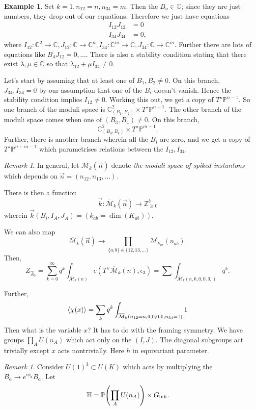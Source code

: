 \documentclass[leqno, openany]{memoir}
\theoremstyle{definition}
\newtheorem{exm}[thm]{Example}
\theoremstyle{remark}
\newtheorem{rmk}[thm]{Remark}
\theoremstyle{plain}
\theoremstyle{definition}
\theoremstyle{remark}
\newcommand{\mr}[1]{\mathrm{#1}}
\begin{document}
\begin{exm}
Set $k = 1, n_{12} = n, n_{34} = m$. Then the $B_a \in \mathbb{C}$; since they are just 
numbers, they drop out of our equations. 
Therefore we just have equations 
\begin{align*}
    I_{12} J_{12} &= 0
\\
    I_{34} J_{34} &= 0,
\end{align*}
where $I_{12} : \mathbb{C}^2 \to \mathbb{C}, J_{12} : \mathbb{C} \to \mathbb{C}^n, I_{34} : \mathbb{C}^m \to \mathbb{C}, J_{34} : \mathbb{C} \to \mathbb{C}^m$.
 Further there are lots of equations like $B_4 J_{12} = 0, \dots$. 
 There is also a stability condition 
 stating that there exist $\lambda,\mu \in \mathbb{C}$ so that $\lambda_{12} + \mu I_{34} \neq 0$. 

Let's start by assuming that at least one of $B_1,B_2 \neq 0$. 
On this branch, $J_{34}, I_{34} = 0$ by our assumption that one of the $B_i$ doesn't vanish.
Hence the stability condition implies $I_{12} \neq 0$. 
Working this out, we get a copy of $T^\star \mathbb{P}^{n-1}$. 
So one branch of the moduli space is $\mathbb{C}^2_{(B_1,B_2)} \times T^\star \mathbb{P}^{n-1}$.
The other branch of the moduli space comes when one of $(B_3,B_4) \neq 0$. On this branch, 
\[
\mathbb{C}^2_{(B_3,B_4)} \times T^\star \mathbb{P}^{m-1}.
\]
Further, there is another branch wherein all the $B_i$ are zero, and 
we get a copy of $T^\star \mathbb{P}^{n+ m- 1}$ 
which parametrises relations between the $I_{12}, I_{34}$. 
\end{exm}

\begin{rmk}
In general, let $\overline{\mathcal{M}}_k(\vec{n})$ denote \emph{the moduli space of spiked instantons}
which depends on $\vec{n} = (n_{12}, n_{13},\dots)$.

There is then a function 
\[
\vec{k} : \overline{\mathcal{M}}_k (\vec{n}) \to \mathbb{Z}^b_{\geq 0}
\]
wherein $\vec{k}(B_i, I_A, J_A) = (k_{ab} =  \dim(K_{ab}))$.

We can also map 
\[
\overline{\mathcal{M}}_k(\vec{n}) \to \prod_{\{a,b\} \in \{12,13,\dots\}} \overline{\mathcal{M}_{k_{ab}}}(n_{ab}).
\]
Then, 
\[
Z_{\widehat{A}_0} = \sum_{k = 0}^\infty q^k \int_{\overline{\mathcal{M}}_k(n)} c(T^\vee \overline{\mathcal{M}}_k(n), \epsilon_3) = \sum \int_{\overline{\mathcal{M}}_k(n,0,0,0,0,)}  q^k.
\]

Further, 
\[
\ev{\chi(x)} = \sum_{k} q^k \int_{\overline{\mathcal{M}}_k(n_{12} = n,0,0,0,0,n_{34} = 1)} 1
\]
Then what is the variable $x$? It has to do with the framing symmetry.
We have groups $\prod_A U(n_A)$ which act only on the $(I,J)$. The diagonal subgroups act trivially except $x$ acts nontrivially. 
Here $h$ in equivariant parameter.
\end{rmk}
\begin{rmk}
  Consider $U(1)^3 \subset U(K)$ which acts by multiplying the $B_a \to e^{i\phi_a} B_a$. 
Let 
\[ 
\mathbb{H} = \mathbb{P} \qty(\prod_A U(n_A)) \times G_{\mr{init}}.
    \]
\end{rmk}
\end{document}
